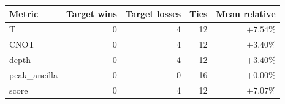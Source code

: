 \begin{tabular}{lrrrr}
\toprule
Metric & Target wins & Target losses & Ties & Mean relative \\
\midrule
T & 0 & 4 & 12 & $+7.54\%$ \\
CNOT & 0 & 4 & 12 & $+3.40\%$ \\
depth & 0 & 4 & 12 & $+3.40\%$ \\
peak_ancilla & 0 & 0 & 16 & $+0.00\%$ \\
score & 0 & 4 & 12 & $+7.07\%$ \\
\bottomrule
\end{tabular}
